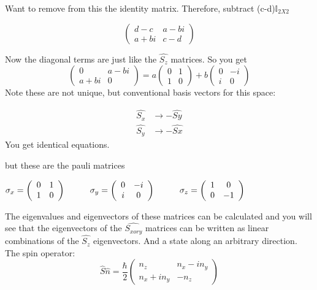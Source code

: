 \documentclass{article}
\begin{document}
Want to remove from this the identity matrix. Therefore, subtract (c-d)$\mathbb{I}_{2X2}${

\[\left(\begin{array}{cc}
d-c & a-bi \\
a+bi & c-d
\end{array}\right)\]


Now the diagonal terms are just like the $\hat{S_z}$ matrices. So you get
\begin{equation}  
\left(\begin{array}{cc}
0 & a-bi \\
a+bi & 0
\end{array}\right)
=
a\left(\begin{array}{cc}
0 & 1 \\
1 & 0
\end{array}\right)
+b
\left(\begin{array}{cc}
0 & -i \\
i & 0
\end{array}\right)
\end{equation}
Note these are not unique, but conventional basis vectors for this space: 

\begin{align}
\hat{S_x}&\rightarrow -\hat{Sy} \\
\hat{S_y}&\rightarrow -\hat{Sx}
\end{align}
You get identical equations. 

but these are the pauli matrices
\begin{center} 
$\sigma_x= 
\left(\begin{array}{cc}
0 & 1 \\
1 & 0
\end{array}\right)
\hspace{10mm}
\sigma_y=
\left(\begin{array}{cc}
0 & -i \\
i & 0
\end{array}\right)
\hspace{10mm}
\sigma_z=
\left(\begin{array}{cc}
1 & 0\\
0 & -1
\end{array}\right)$
\end{center}
The eigenvalues and eigenvectors of these matrices can be calculated and you will see that the eigenvectors of the $\hat{S_{x or y}}$ matrices can be written as linear combinations of the $\hat{S_z}$ eigenvectors. And a state along an arbitrary direction. 
\vspace{5mm}
The spin operator:
\begin{equation}
\hat{S}\hat{n}=\frac{\hbar}{2}
\left(\begin{array}{ccc}
n_z & n_x-in_y\\
n_x+in_y & -n_z
\end{array}\right)
\end{equation}

}
\end{document}

